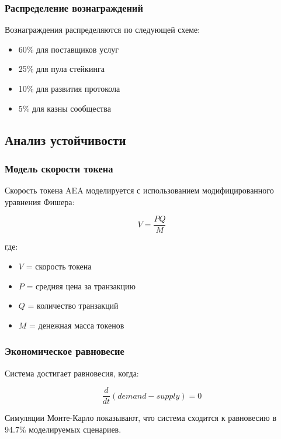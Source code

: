 \documentclass[12pt,a4paper]{article}
\begin{document}
\subsubsection{Распределение вознаграждений}

Вознаграждения распределяются по следующей схеме:
\begin{itemize}
\item 60\% для поставщиков услуг
\item 25\% для пула стейкинга
\item 10\% для развития протокола
\item 5\% для казны сообщества
\end{itemize}

\subsection{Анализ устойчивости}

\subsubsection{Модель скорости токена}

Скорость токена AEA моделируется с использованием модифицированного уравнения Фишера:

\begin{equation}
V = \frac{PQ}{M}
\end{equation}

где:
\begin{itemize}
\item $V$ = скорость токена
\item $P$ = средняя цена за транзакцию
\item $Q$ = количество транзакций
\item $M$ = денежная масса токенов
\end{itemize}

\subsubsection{Экономическое равновесие}

Система достигает равновесия, когда:

\begin{equation}
\frac{d}{dt}(demand - supply) = 0
\end{equation}

Симуляции Монте-Карло показывают, что система сходится к равновесию в 94.7\% моделируемых сценариев.
\end{document}
